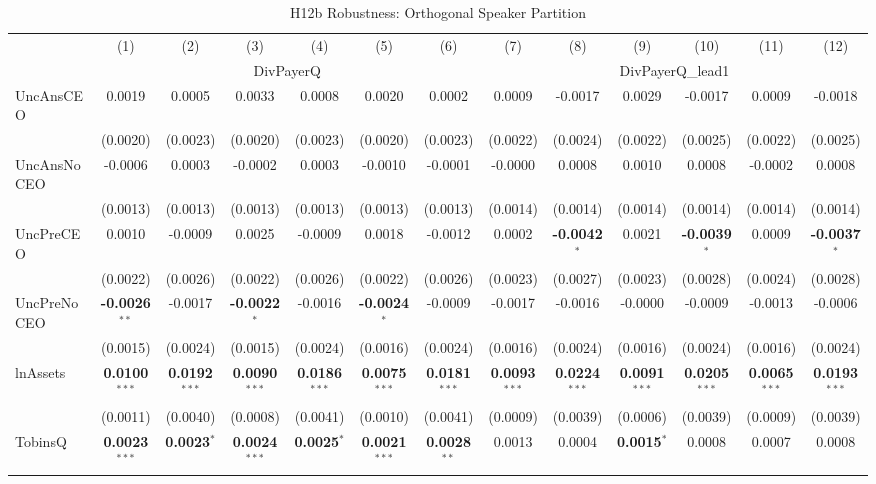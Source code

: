\documentclass[11pt,a4paper]{article}
\begin{document}
\clearpage
\begin{table}[htbp]
\centering
\caption{H12b Robustness: Orthogonal Speaker Partition}
\label{tab:h12b_robust}
\scriptsize
\begin{tabular}{lcccccccccccc}
\toprule
 & (1) & (2) & (3) & (4) & (5) & (6) & (7) & (8) & (9) & (10) & (11) & (12) \\
 & \multicolumn{6}{c}{DivPayerQ} & \multicolumn{6}{c}{DivPayerQ\_lead1} \\
\cmidrule(lr){2-7} \cmidrule(lr){8-13}
\midrule
UncAnsCEO & 0.0019 & 0.0005 & 0.0033 & 0.0008 & 0.0020 & 0.0002 & 0.0009 & -0.0017 & 0.0029 & -0.0017 & 0.0009 & -0.0018 \\
 & (0.0020) & (0.0023) & (0.0020) & (0.0023) & (0.0020) & (0.0023) & (0.0022) & (0.0024) & (0.0022) & (0.0025) & (0.0022) & (0.0025) \\
UncAnsNoCEO & -0.0006 & 0.0003 & -0.0002 & 0.0003 & -0.0010 & -0.0001 & -0.0000 & 0.0008 & 0.0010 & 0.0008 & -0.0002 & 0.0008 \\
 & (0.0013) & (0.0013) & (0.0013) & (0.0013) & (0.0013) & (0.0013) & (0.0014) & (0.0014) & (0.0014) & (0.0014) & (0.0014) & (0.0014) \\
UncPreCEO & 0.0010 & -0.0009 & 0.0025 & -0.0009 & 0.0018 & -0.0012 & 0.0002 & \textbf{-0.0042}$^{*}$ & 0.0021 & \textbf{-0.0039}$^{*}$ & 0.0009 & \textbf{-0.0037}$^{*}$ \\
 & (0.0022) & (0.0026) & (0.0022) & (0.0026) & (0.0022) & (0.0026) & (0.0023) & (0.0027) & (0.0023) & (0.0028) & (0.0024) & (0.0028) \\
UncPreNoCEO & \textbf{-0.0026}$^{**}$ & -0.0017 & \textbf{-0.0022}$^{*}$ & -0.0016 & \textbf{-0.0024}$^{*}$ & -0.0009 & -0.0017 & -0.0016 & -0.0000 & -0.0009 & -0.0013 & -0.0006 \\
 & (0.0015) & (0.0024) & (0.0015) & (0.0024) & (0.0016) & (0.0024) & (0.0016) & (0.0024) & (0.0016) & (0.0024) & (0.0016) & (0.0024) \\
\midrule
lnAssets & \textbf{0.0100}$^{***}$ & \textbf{0.0192}$^{***}$ & \textbf{0.0090}$^{***}$ & \textbf{0.0186}$^{***}$ & \textbf{0.0075}$^{***}$ & \textbf{0.0181}$^{***}$ & \textbf{0.0093}$^{***}$ & \textbf{0.0224}$^{***}$ & \textbf{0.0091}$^{***}$ & \textbf{0.0205}$^{***}$ & \textbf{0.0065}$^{***}$ & \textbf{0.0193}$^{***}$ \\
 & (0.0011) & (0.0040) & (0.0008) & (0.0041) & (0.0010) & (0.0041) & (0.0009) & (0.0039) & (0.0006) & (0.0039) & (0.0009) & (0.0039) \\
TobinsQ & \textbf{0.0023}$^{***}$ & \textbf{0.0023}$^{*}$ & \textbf{0.0024}$^{***}$ & \textbf{0.0025}$^{*}$ & \textbf{0.0021}$^{***}$ & \textbf{0.0028}$^{**}$ & 0.0013 & 0.0004 & \textbf{0.0015}$^{*}$ & 0.0008 & 0.0007 & 0.0008 \\

\end{tabular}
\end{table}
\end{document}
